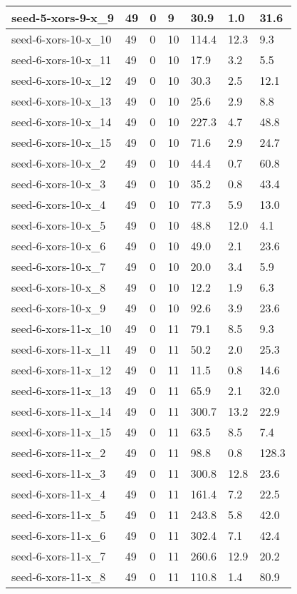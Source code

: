 \begin{scriptsize}
\begin{longtable}{|p{5cm}|l|l|l|l|l|l|}
seed-5-xors-9-x\_9&49&0&9&30.9&1.0&31.6 \\ \hline 
seed-6-xors-10-x\_10&49&0&10&114.4&12.3&9.3 \\ \hline 
seed-6-xors-10-x\_11&49&0&10&17.9&3.2&5.5 \\ \hline 
seed-6-xors-10-x\_12&49&0&10&30.3&2.5&12.1 \\ \hline 
seed-6-xors-10-x\_13&49&0&10&25.6&2.9&8.8 \\ \hline 
seed-6-xors-10-x\_14&49&0&10&227.3&4.7&48.8 \\ \hline 
seed-6-xors-10-x\_15&49&0&10&71.6&2.9&24.7 \\ \hline 
seed-6-xors-10-x\_2&49&0&10&44.4&0.7&60.8 \\ \hline 
seed-6-xors-10-x\_3&49&0&10&35.2&0.8&43.4 \\ \hline 
seed-6-xors-10-x\_4&49&0&10&77.3&5.9&13.0 \\ \hline 
seed-6-xors-10-x\_5&49&0&10&48.8&12.0&4.1 \\ \hline 
seed-6-xors-10-x\_6&49&0&10&49.0&2.1&23.6 \\ \hline 
seed-6-xors-10-x\_7&49&0&10&20.0&3.4&5.9 \\ \hline 
seed-6-xors-10-x\_8&49&0&10&12.2&1.9&6.3 \\ \hline 
seed-6-xors-10-x\_9&49&0&10&92.6&3.9&23.6 \\ \hline 
seed-6-xors-11-x\_10&49&0&11&79.1&8.5&9.3 \\ \hline 
seed-6-xors-11-x\_11&49&0&11&50.2&2.0&25.3 \\ \hline 
seed-6-xors-11-x\_12&49&0&11&11.5&0.8&14.6 \\ \hline 
seed-6-xors-11-x\_13&49&0&11&65.9&2.1&32.0 \\ \hline 
seed-6-xors-11-x\_14&49&0&11&300.7&13.2&22.9 \\ \hline 
seed-6-xors-11-x\_15&49&0&11&63.5&8.5&7.4 \\ \hline 
seed-6-xors-11-x\_2&49&0&11&98.8&0.8&128.3 \\ \hline 
seed-6-xors-11-x\_3&49&0&11&300.8&12.8&23.6 \\ \hline 
seed-6-xors-11-x\_4&49&0&11&161.4&7.2&22.5 \\ \hline 
seed-6-xors-11-x\_5&49&0&11&243.8&5.8&42.0 \\ \hline 
seed-6-xors-11-x\_6&49&0&11&302.4&7.1&42.4 \\ \hline 
seed-6-xors-11-x\_7&49&0&11&260.6&12.9&20.2 \\ \hline 
seed-6-xors-11-x\_8&49&0&11&110.8&1.4&80.9 \\ \hline 

\end{longtable}
\end{scriptsize}
